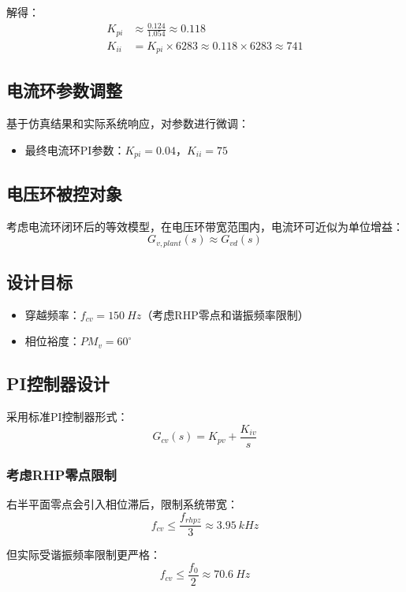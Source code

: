 \documentclass[11pt,a4paper]{article}
\begin{document}
解得：
\begin{align}
K_{pi} &\approx \frac{0.124}{1.054} \approx 0.118 \\
K_{ii} &= K_{pi} \times 6283 \approx 0.118 \times 6283 \approx 741
\end{align}

\subsection{电流环参数调整}
基于仿真结果和实际系统响应，对参数进行微调：
\begin{itemize}
\item 最终电流环PI参数：$K_{pi} = 0.04$，$K_{ii} = 75$
\end{itemize}

\subsection{电压环被控对象}
考虑电流环闭环后的等效模型，在电压环带宽范围内，电流环可近似为单位增益：
\begin{equation}
G_{v,plant}(s) \approx G_{vd}(s)
\end{equation}

\subsection{设计目标}
\begin{itemize}
\item 穿越频率：$f_{cv} = \SI{150}{Hz}$（考虑RHP零点和谐振频率限制）
\item 相位裕度：$PM_v = 60^\circ$
\end{itemize}

\subsection{PI控制器设计}
采用标准PI控制器形式：
\begin{equation}
G_{cv}(s) = K_{pv} + \frac{K_{iv}}{s}
\end{equation}

\subsubsection{考虑RHP零点限制}
右半平面零点会引入相位滞后，限制系统带宽：
\begin{equation}
f_{cv} \leq \frac{f_{rhpz}}{3} \approx \SI{3.95}{kHz}
\end{equation}

但实际受谐振频率限制更严格：
\begin{equation}
f_{cv} \leq \frac{f_0}{2} \approx \SI{70.6}{Hz}
\end{equation}
\end{document}
